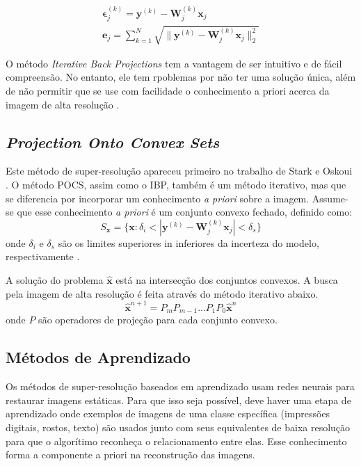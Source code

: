 \begin{gather}
	\label{eq:ibperror1} \mathbf{\epsilon}^{(k)}_j = \mathbf{y}^{(k)}-\mathbf{W}^{(k)}_j \mathbf{x}_j \\
	\label{eq:ibperrorsum} \mathbf{e}_j = \sum^N_{k=1}{\sqrt{\|\mathbf{y}^{(k)}-\mathbf{W}^{(k)}_j \mathbf{x}_j\|^2_2}}
\end{gather}

O método \emph{Iterative Back Projections} tem a vantagem de ser intuitivo e de fácil compreensão.
No entanto, ele tem rpoblemas por não ter uma solução única, além de não permitir que se use com facilidade o conhecimento a priori acerca da imagem de alta resolução \cite{nasrollahi2014super, park2003super}.

\subsection{\emph{Projection Onto Convex Sets}}
Este método de super-resolução apareceu primeiro no trabalho de Stark e Oskoui \cite{stark1989high}.
O método POCS, assim como o IBP, também é um método iterativo, mas que se diferencia por incorporar um conhecimento \emph{a priori} sobre a imagem. Assume-se que esse conhecimento \emph{a priori} é um conjunto convexo fechado, definido como:
\begin{equation}
	S_{\mathbf{x}} = \{ \mathbf{x} : \delta_i < |\mathbf{y}^{(k)}-\mathbf{W}^{(k)}_j \mathbf{x}_j| < \delta_s \}
\end{equation}
onde $\delta_i$ e $\delta_s$ são os limites superiores in inferiores da incerteza do modelo, respectivamente \cite{nasrollahi2014super}.

A solução do problema $\hat{\mathbf{x}}$ está na intersecção dos conjuntos convexos. A busca pela imagem de alta resolução é feita através do método iterativo abaixo\cite{reis2014metodo}.
\begin{equation}
	\hat{\mathbf{x}}^{n+1} = P_m P_{m-1} ... P_1 P_0 \hat{\mathbf{x}}^{n}
\end{equation}
onde $P$ são operadores de projeção para cada conjunto convexo.

\subsection{Métodos de Aprendizado}
Os métodos de super-resolução baseados em aprendizado usam redes neurais para restaurar imagens estáticas.
Para que isso seja possível, deve haver uma etapa de aprendizado onde exemplos de imagens de uma classe específica (impressões digitais, rostos, texto) são usados junto com seus equivalentes de baixa resolução para que o algorítimo reconheça o relacionamento entre elas.
Esse conhecimento forma a componente a priori na reconstrução das imagens.

